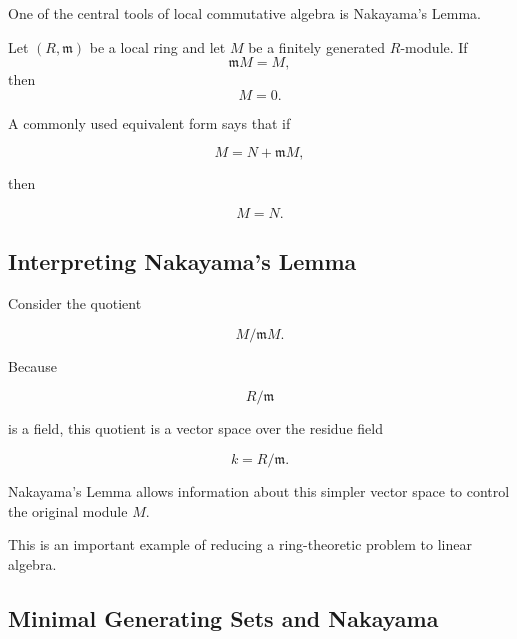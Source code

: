 One of the central tools of local commutative algebra is Nakayama's Lemma.

\begin{theorem}
Let \((R,\mathfrak m)\) be a local ring and let \(M\) be a finitely generated
\(R\)-module. If
\[ \mathfrak mM=M, \]
then
\[ M=0. \]
\end{theorem}

A commonly used equivalent form says that if

\[ M=N+\mathfrak mM, \]

then

\[ M=N. \]

\subsection{Interpreting Nakayama's Lemma}
\label{subsec:interpreting-nakayama}

Consider the quotient

\[ M/\mathfrak mM. \]

Because

\[ R/\mathfrak m \]

is a field, this quotient is a vector space over the residue field

\[ k=R/\mathfrak m. \]

Nakayama's Lemma allows information about this simpler vector space to
control the original module \(M\).

\begin{center}
\end{center}

This is an important example of reducing a ring-theoretic problem to linear
algebra.

\subsection{Minimal Generating Sets and Nakayama}
\label{subsec:minimal-generators-nakayama}

